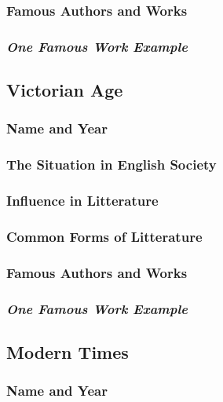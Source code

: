 \subsubsection{Famous Authors and Works}

\subsubsection{\textit{One Famous Work Example}}

\newpage
\subsection{Victorian Age}

\subsubsection{Name and Year}

\subsubsection{The Situation in English Society}

\subsubsection{Influence in Litterature}

\subsubsection{Common Forms of Litterature}

\subsubsection{Famous Authors and Works}

\subsubsection{\textit{One Famous Work Example}}

\newpage
\subsection{Modern Times}

\subsubsection{Name and Year}

